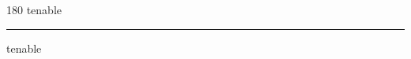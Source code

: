 
\begin{frame}
\begin{center}
\begin{turn}{180}
{\fontsize{2.5cm}{1em}\selectfont tenable}
\end{turn}
\vspace{1em}\par  
\hrule
\vspace{1em}\par  
{\fontsize{2.5cm}{1em}\selectfont tenable}
\end{center}
\end{frame}
